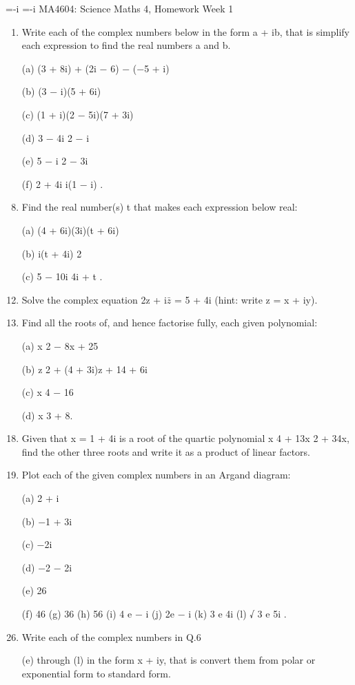 \begin{enumerate}
{={}-{}i} {={}-{}i}
MA4604: Science Maths 4, Homework Week 1
\begin{enumerate}
\item Write each of the complex numbers below in the form a + ib, that is simplify each
expression to find the real numbers a and b.
\item[(a)] (3 + 8i) + (2i − 6) − (−5 + i) \item[(b)] (3 − i)(5 + 6i) \item[(c)] (1 + i)(2 − 5i)(7 + 3i)
\item[(d)] 3 − 4i
2 − i
\item[(e)] 5 − i
2 − 3i
\item[(f)] 2 + 4i
i(1 − i)
.
\item Find the real number(s) t that makes each expression below real:
\item[(a)] (4 + 6i)(3i)(t + 6i) \item[(b)] i(t + 4i)
2
\item[(c)] 5 − 10i
4i + t
.
\item Solve the complex equation 2z + i$\bar{z}$ = 5 + 4i (hint: write z = x + iy).
\item Find all the roots of, and hence factorise fully, each given polynomial:
\item[(a)] x
2 − 8x + 25 \item[(b)] z
2 + (4 + 3i)z + 14 + 6i \item[(c)] x
4 − 16 \item[(d)] x
3 + 8.
\item Given that x = 1 + 4i is a root of the quartic polynomial x
4 + 13x
2 + 34x, find the other
three roots and write it as a product of linear factors.
\item Plot each of the given complex numbers in an Argand diagram:
\item[(a)] 2 + i \item[(b)] −1 + 3i \item[(c)] −2i \item[(d)] −2 − 2i
\item[(e)] 26
\item[(f)] 46
(g) 36
(h) 56 \pi
(i) 4 e
− i (j) 2e
− i (k) 3 e
4i (l) √
3 e
5i .
\item Write each of the complex numbers in Q.6 \item[(e)] through (l) in the form x + iy, that is
convert them from polar or exponential form to standard form.
\end{enumerate}


\end{enumerate}
